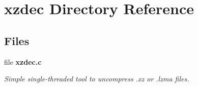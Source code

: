 \section{xzdec Directory Reference}
\label{dir_fb8a4ba6c207a1908b173dd397a38a35}
\subsection*{Files}
\begin{DoxyCompactItemize}
\item 
file \textbf{ xzdec.\+c}
\begin{DoxyCompactList}\small\item\em Simple single-\/threaded tool to uncompress .xz or .lzma files. \end{DoxyCompactList}\end{DoxyCompactItemize}
